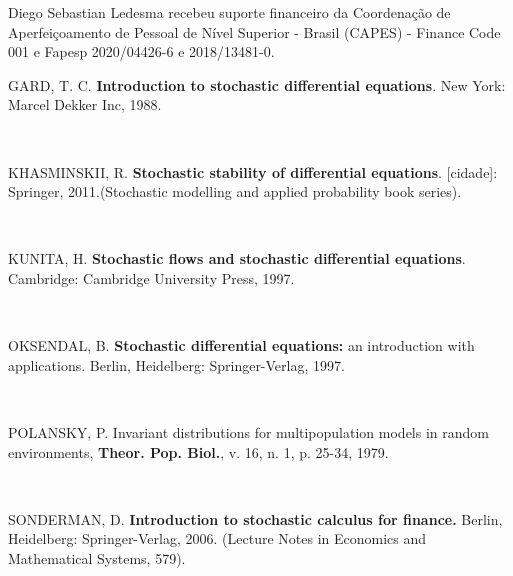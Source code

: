 \documentclass[12pt]{article}
\begin{document}
\noindent Diego Sebastian Ledesma recebeu suporte financeiro da Coordenação de Aperfeiçoamento de
Pessoal de Nível Superior - Brasil (CAPES) - Finance Code 001 e Fapesp 
2020/04426-6 e 2018/13481-0.  


\Referenciasbibliograficas


\begin{flushleft}

GARD, T. C. \textbf{Introduction to stochastic differential equations}. New York: Marcel Dekker Inc, 1988.

\

KHASMINSKII, R. \textbf{Stochastic stability of differential equations}. [cidade]: Springer, 2011.(Stochastic modelling and applied probability book series).

\

KUNITA, H. \textbf{Stochastic flows and stochastic differential equations}. Cambridge: Cambridge University Press, 1997.	

\

OKSENDAL, B. \textbf{Stochastic differential equations:} an introduction with applications. Berlin, Heidelberg: Springer-Verlag, 1997.
	
\	
	
POLANSKY, P.  Invariant distributions for multipopulation models in
random environments,  \textbf{Theor. Pop. Biol.}, v. 16, n. 1, p. 25-34, 1979.	

\

SONDERMAN, D. \textbf{Introduction to stochastic calculus for finance.} Berlin, Heidelberg: Springer-Verlag, 2006. (Lecture Notes in Economics and Mathematical Systems, 579).
\	
	
	
	
	
\end{flushleft}
\end{document}
